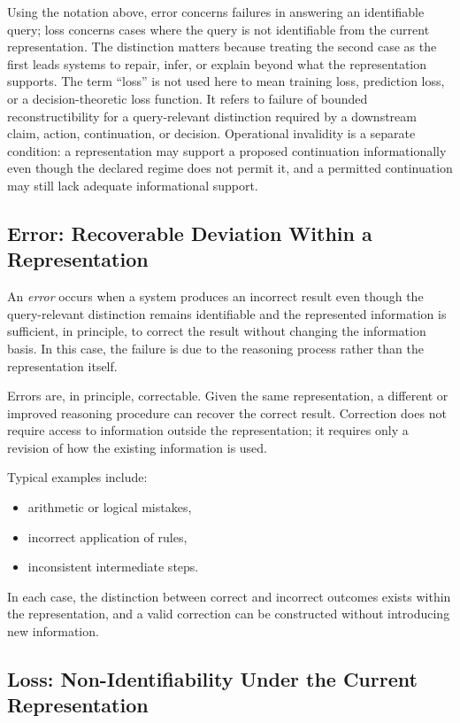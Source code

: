\documentclass[11pt]{article}
\theoremstyle{definition}
\theoremstyle{remark}
\begin{document}
Using the notation above, error concerns failures in answering an identifiable query; loss concerns cases where the query is not identifiable from the current representation. The distinction matters because treating the second case as the first leads systems to repair, infer, or explain beyond what the representation supports. The term ``loss'' is not used here to mean training loss, prediction loss, or a decision-theoretic loss function. It refers to failure of bounded reconstructibility for a query-relevant distinction required by a downstream claim, action, continuation, or decision. Operational invalidity is a separate condition: a representation may support a proposed continuation informationally even though the declared regime does not permit it, and a permitted continuation may still lack adequate informational support.

\subsection{Error: Recoverable Deviation Within a Representation}

An \emph{error} occurs when a system produces an incorrect result even though the query-relevant distinction remains identifiable and the represented information is sufficient, in principle, to correct the result without changing the information basis. In this case, the failure is due to the reasoning process rather than the representation itself.

Errors are, in principle, correctable. Given the same representation, a different or improved reasoning procedure can recover the correct result. Correction does not require access to information outside the representation; it requires only a revision of how the existing information is used.

Typical examples include:
\begin{itemize}[leftmargin=1.5em]
    \item arithmetic or logical mistakes,
    \item incorrect application of rules,
    \item inconsistent intermediate steps.
\end{itemize}

In each case, the distinction between correct and incorrect outcomes exists within the representation, and a valid correction can be constructed without introducing new information.

\subsection{Loss: Non-Identifiability Under the Current Representation}
\end{document}
